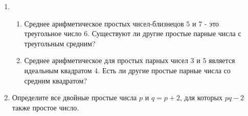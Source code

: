 \documentclass[11pt]{article}
\begin{document}
\begin{enumerate}
\item
\begin{enumerate}
\item Среднее арифметическое простых чисел-близнецов $5$ и $7$ - это треугольное число $6$. Существуют ли другие простые парные числа с треугольным средним?

\item Среднее арифметическое для простых парных чисел $3$ и $5$ является идеальным квадратом $4$. Есть ли другие простые парные числа со средним квадратом?
\end{enumerate}

\item Определите все двойные простые числа $p$ и $q=p+2$, для которых $pq-2$ также простое число.

\end{enumerate}
\end{document}

